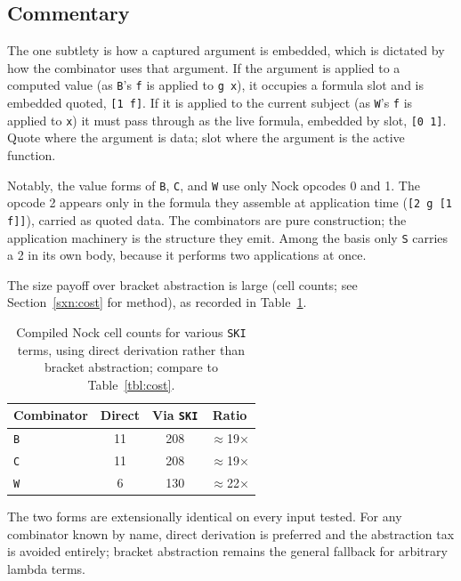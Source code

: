 \documentclass[twoside]{article}
\begin{document}
\subsection{Commentary}

The one subtlety is how a captured argument is embedded, which is dictated by how the combinator uses that argument. If the argument is applied to a computed value (as \texttt{B}'s \lstinline[style=inlinecode]{f} is applied to \lstinline[style=inlinecode]{g x}), it occupies a formula slot and is embedded quoted, \lstinline[style=inlinecode]{[1 f]}.  If it is applied to the current subject (as \texttt{W}'s \lstinline[style=inlinecode]{f} is applied to \lstinline[style=inlinecode]{x}) it must pass through as the live formula, embedded by slot, \lstinline[style=inlinecode]{[0 1]}. Quote where the argument is data; slot where the argument is the active function.

Notably, the value forms of \texttt{B}, \texttt{C}, and \texttt{W} use only Nock opcodes 0 and 1. The opcode 2 appears only in the formula they assemble at application time (\lstinline[style=inlinecode]{[2 g [1 f]]}), carried as quoted data.  The combinators are pure construction; the application machinery is the structure they emit. Among the basis only \texttt{S} carries a 2 in its own body, because it performs two applications at once.

The size payoff over bracket abstraction is large (cell counts; see Section~\ref{sxn:cost} for method), as recorded in Table~\ref{tbl:direct}.

\begin{table}
\caption{Compiled Nock cell counts for various \texttt{SKI} terms, using direct derivation rather than bracket abstraction; compare to Table~\ref{tbl:cost}.}
\label{tbl:direct}
\centering
\begin{tabular}{lccc}
\hline \hline
Combinator & Direct & Via \texttt{SKI} & Ratio \\
\hline
\texttt{B} & 11 & 208 & $\approx$19× \\
\texttt{C} & 11 & 208 & $\approx$19× \\
\texttt{W} & 6 & 130 & $\approx$22× \\
\end{tabular}
\end{table}

The two forms are extensionally identical on every input tested.  For any combinator known by name, direct derivation is preferred and the abstraction tax is avoided entirely; bracket abstraction remains the general fallback for arbitrary lambda terms.
\end{document}
